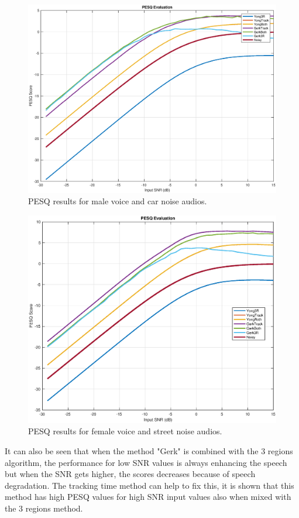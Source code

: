 \begin{figure}[!ht]
  \centering
	\includegraphics[width=130mm]{Kap4/male3N}
	\caption{PESQ results for male voice and car noise audios.}
	\label{fig:male3N}
\end{figure}


\begin{figure}[!ht]
  \centering
	\includegraphics[width=130mm]{Kap4/female2n}
	\caption{PESQ results for female voice and street noise audios.}
	\label{fig:female2n}
\end{figure}

It can also be seen that when the method "Gerk" is combined with the 3 regions algorithm, the performance for low SNR values is always enhancing the speech but when the SNR gets higher, the scores decreases because of speech degradation. The tracking time method can help to fix this, it is shown that this method has high PESQ values for high SNR input values also when mixed with the 3 regions method.\\



